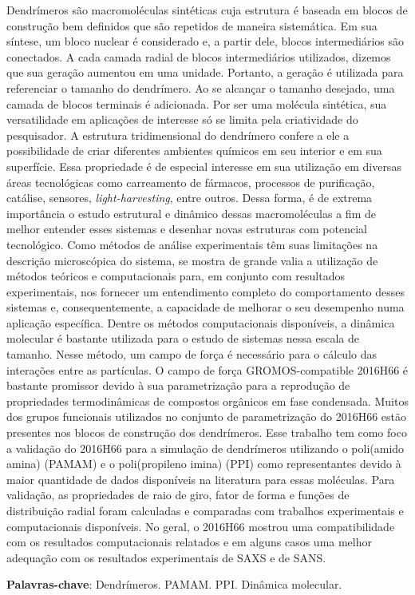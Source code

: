 \documentclass[
	12pt,				%
	openright,			%
	twoside,			%
	a4paper,			%
	english,			%
	french,				%
	spanish,			%
	brazil				%
	]{abntex2}
\begin{document}
\setlength{\absparsep}{18pt} %
\begin{resumo}
Dendrímeros são macromoléculas sintéticas cuja estrutura é baseada em blocos de construção bem definidos que são repetidos de maneira sistemática.
Em sua síntese, um bloco nuclear é considerado e, a partir dele, blocos intermediários são conectados.
A cada camada radial de blocos intermediários utilizados, dizemos que sua geração aumentou em uma unidade.
Portanto, a geração é utilizada para referenciar o tamanho do dendrímero.
Ao se alcançar o tamanho desejado, uma camada de blocos terminais é adicionada.
Por ser uma molécula sintética, sua versatilidade em aplicações de interesse só se limita pela criatividade do pesquisador.
A estrutura tridimensional do dendrímero confere a ele a possibilidade de criar diferentes ambientes químicos em seu interior e em sua superfície.
Essa propriedade é de especial interesse em sua utilização em diversas áreas tecnológicas como carreamento de fármacos, processos de purificação, catálise, sensores, \textit{light-harvesting}, entre outros.
Dessa forma, é de extrema importância o estudo estrutural e dinâmico dessas macromoléculas a fim de melhor entender esses sistemas e desenhar novas estruturas com potencial tecnológico.
Como métodos de análise experimentais têm suas limitações na descrição microscópica do sistema, se mostra de grande valia a utilização de métodos teóricos e computacionais para, em conjunto com resultados experimentais, nos fornecer um entendimento completo do comportamento desses sistemas e, consequentemente, a capacidade de melhorar o seu desempenho numa aplicação específica.
Dentre os métodos computacionais disponíveis, a dinâmica molecular é bastante utilizada para o estudo de sistemas nessa escala de tamanho.
Nesse método, um campo de força é necessário para o cálculo das interações entre as partículas.
O campo de força GROMOS-compatible 2016H66 é bastante promissor devido à sua parametrização para a reprodução de propriedades termodinâmicas de compostos orgânicos em fase condensada.
Muitos dos grupos funcionais utilizados no conjunto de parametrização do 2016H66 estão presentes nos blocos de construção dos dendrímeros.
Esse trabalho tem como foco a validação do 2016H66 para a simulação de dendrímeros utilizando o poli(amido amina) (PAMAM) e o poli(propileno imina) (PPI) como representantes devido à maior quantidade de dados disponíveis na literatura para essas moléculas.
Para validação, as propriedades de raio de giro, fator de forma e funções de distribuição radial foram calculadas e comparadas com trabalhos experimentais e computacionais disponíveis.
No geral, o 2016H66 mostrou uma compatibilidade com os resultados computacionais relatados e  em alguns casos uma melhor adequação com os resultados experimentais de SAXS e de SANS.   

 \textbf{Palavras-chave}: Dendrímeros. PAMAM. PPI. Dinâmica molecular.
\end{resumo}
\end{document}

